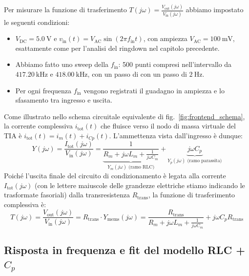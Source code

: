 \documentclass[11pt,a4paper]{article}
\begin{document}
\vspace{0.3cm}
\noindent Per misurare la funzione di trasferimento $T(j\omega) = \frac{V_{\text{out}}(j\omega)}{V_{\text{in}}(j\omega)}$ abbiamo impostato le seguenti condizioni:
\begin{itemize}
    \item $V_{\text{DC}} = \SI{5.0}{\volt}$ e $v_{\text{in}}(t) = V_{\text{AC}} \sin(2\pi f_{\text{in}} t)$, con ampiezza $V_{\text{AC}} = \SI{100}{\milli\volt}$, esattamente come per l'analisi del ringdown nel capitolo precedente.
    \item Abbiamo fatto uno sweep della $f_{\text{in}}$: 500 punti compresi nell'intervallo da $\SI{417.20}{\kilo\hertz}$ e $\SI{418.00}{\kilo\hertz}$, con un passo di con un passo di $\SI{2}{\hertz}$.
    \item Per ogni frequenza $f_{\text{in}}$ vengono registrati il guadagno in ampiezza e lo sfasamento tra ingresso e uscita.
\end{itemize}

\noindent Come illustrato nello schema circuitale equivalente di fig.~\ref{fig:frontend_schema}, la corrente complessiva $i_{\text{tot}}(t)$ che fluisce verso il nodo di massa virtuale del TIA è $i_{\text{tot}}(t) = i_m(t) + i_{Cp}(t)$. L'ammettenza vista dall'ingresso è dunque:
\begin{equation}
    Y(j\omega) = \frac{I_{\text{tot}}(j\omega)}{V_{\text{in}}(j\omega)} = \underbrace{\frac{1}{R_m + j\omega L_m + \frac{1}{j\omega C_m}}}_{Y_m(j\omega) \text{ (ramo RLC)}} + \underbrace{j\omega C_p}_{Y_{p}(j\omega) \text{ (ramo parassita)}}
\end{equation}
Poiché l'uscita finale del circuito di condizionamento è legata alla corrente $I_{\text{tot}}(j\omega)$ (con le lettere maiuscole delle grandezze elettriche stiamo indicando le trasformate fasoriali) dalla transresistenza $R_{\text{trans}}$, la funzione di trasferimento complessiva è:
\begin{equation}
    \label{eq:trasferimento_totale}
    T(j\omega) = \frac{V_{\text{out}}(j\omega)}{V_{\text{in}}(j\omega)} = R_{\text{trans}} \cdot Y_{\text{mems}}(j\omega) = \frac{R_{\text{trans}}}{R_m + j\omega L_m + \frac{1}{j\omega C_m}} + j \omega C_p R_{\text{trans}}
\end{equation}

\newpage

\subsection{Risposta in frequenza e fit del modello RLC + \texorpdfstring{$C_p$}{Cp}}
\label{subsec:bode_completo}
\end{document}
